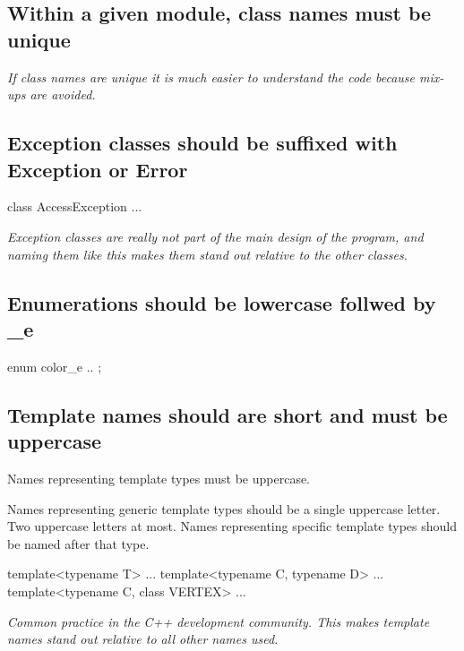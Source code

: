\documentclass[a4paper,11pt,oneside]{scrbook}
\newcommand{\guideline}[1]{{\subsection{#1}}}
\newcommand{\motivation}[1]{{\normalfont \itshape #1}}
\newcommand{\trcode}[1]{{\normalfont \ttfamily #1}}
\begin{document}
\guideline{Within a given module, class names must be unique}
\label{subsec:unique-class-name}

\motivation{
  If class names are unique it is much easier to understand the code because
  mix-ups are avoided.
}

\guideline{Exception classes should be suffixed with \trcode{Exception} or \trcode{Error}}

\begin{code}
  class AccessException {
    ...
  }
\end{code}

\motivation{ 
  Exception classes are really not part of the main design of the program, and
  naming them like this makes them stand out relative to the other classes.
}

\guideline{Enumerations should be lowercase follwed by \trcode{\_e}}

\begin{code}
  enum color_e {
    ..
  };
\end{code}

\guideline{Template names should are short and must be uppercase}

Names representing template types must be uppercase.

Names representing generic template types should be a single uppercase
letter. Two uppercase letters at most. Names representing specific template
types should be named after that type.

\begin{code}
  template<typename T> ... 
  template<typename C, typename D> ... 
  template<typename C, class VERTEX> ...
\end{code}

\motivation{ 
  Common practice in the C++ development community. This makes template names
  stand out relative to all other names used.
}
\end{document}
